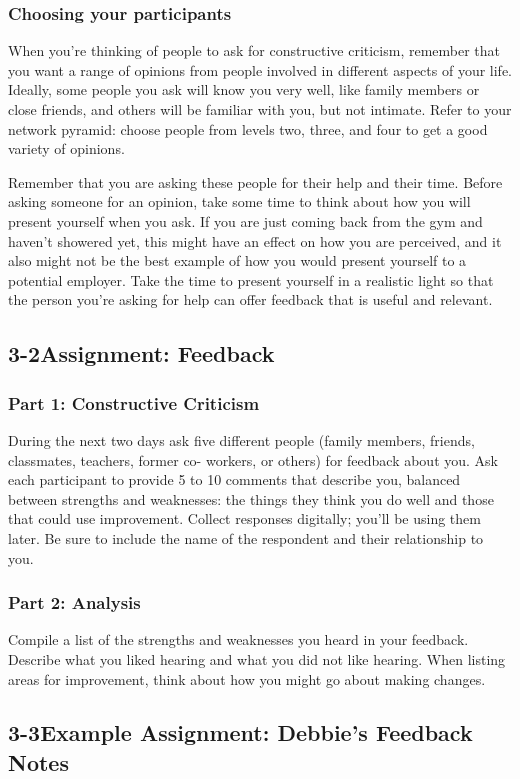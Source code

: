 \subsubsection*{Choosing your participants}
When you're thinking of people to ask for constructive criticism, remember that you want a range of opinions from people involved in different aspects of your life. Ideally, some people you ask will know you very well, like family members or close friends, and others will be familiar with you, but not intimate. Refer to your network pyramid: choose people from levels two, three, and four to get a good variety of opinions.

Remember that you are asking these people for their help and their time. Before asking someone for an opinion, take some time to think about how you will present yourself when you ask. If you are just coming back from the gym and haven't showered yet, this might have an effect on how you are perceived, and it also might not be the best example of how you would present yourself to a potential employer. Take the time to present yourself in a realistic light so that the person you're asking for help can offer feedback that is useful and relevant.
\pagebreak \subsection*{3-2\quad Assignment: Feedback}
\subsubsection*{Part 1: Constructive Criticism}

During the next two days ask five different people (family members, friends, classmates, teachers, former co- workers, or others) for feedback about you. Ask each participant to provide 5 to 10 comments that describe you, balanced between strengths and weaknesses: the things they think you do well and those that could use improvement. Collect responses digitally; you'll be using them later. Be sure to include the name of the respondent and their relationship to you.
\subsubsection*{Part 2: Analysis}

Compile a list of the strengths and weaknesses you heard in your feedback. Describe what you liked hearing and what you did not like hearing. When listing areas for improvement, think about how you might go about making changes.
\pagebreak \subsection*{3-3\quad Example Assignment: Debbie's Feedback Notes}
